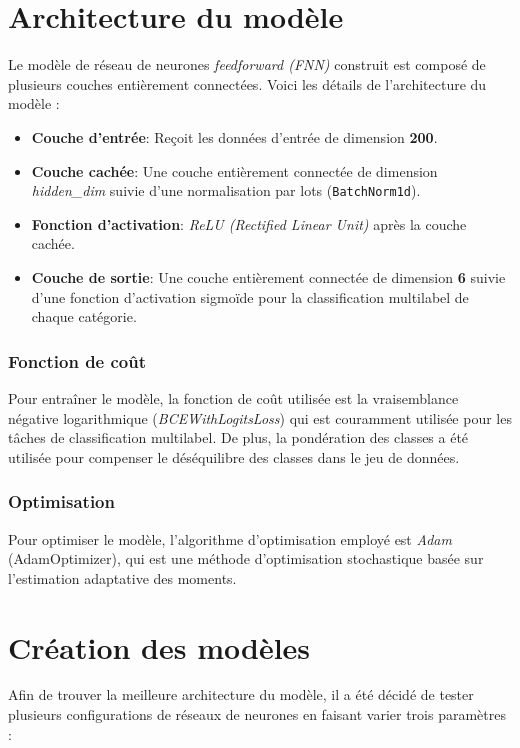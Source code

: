 \section{Architecture du modèle}

Le modèle de réseau de neurones \textit{feedforward (FNN)} construit est composé de plusieurs couches entièrement connectées. Voici les détails de l'architecture du modèle :
\begin{itemize}
    \item \textbf{Couche d'entrée}: Reçoit les données d'entrée de dimension \textbf{200}.
    \item \textbf{Couche cachée}: Une couche entièrement connectée de dimension \textit{hidden\_dim} suivie d'une normalisation par lots (\texttt{BatchNorm1d}).
    \item \textbf{Fonction d'activation}: \textit{ReLU (Rectified Linear Unit)} après la couche cachée.
    \item \textbf{Couche de sortie}: Une couche entièrement connectée de dimension \textbf{6} suivie d'une fonction d'activation sigmoïde pour la classification multilabel de chaque catégorie.
\end{itemize}

\subsubsection{Fonction de coût}

Pour entraîner le modèle, la fonction de coût utilisée est la vraisemblance négative logarithmique (\textit{BCEWithLogitsLoss}) qui est couramment utilisée pour les tâches de classification multilabel.
De plus, la pondération des classes a été utilisée pour compenser le déséquilibre des classes dans le jeu de données.
\subsubsection{Optimisation}

Pour optimiser le modèle, l'algorithme d'optimisation employé est \textit{Adam} (AdamOptimizer), qui est une méthode d'optimisation stochastique basée sur l'estimation adaptative des moments.

\section{Création des modèles}

Afin de trouver la meilleure architecture du modèle, il a été décidé de tester plusieurs configurations de réseaux de neurones en faisant varier trois paramètres :

